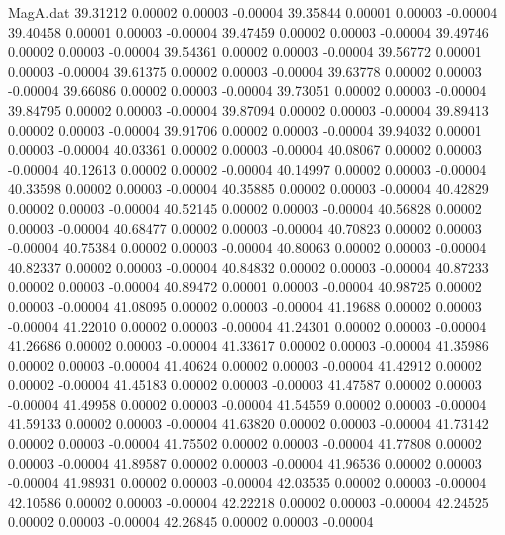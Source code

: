 \begin{filecontents}{MagA.dat}
  39.31212    0.00002    0.00003   -0.00004
  39.35844    0.00001    0.00003   -0.00004
  39.40458    0.00001    0.00003   -0.00004
  39.47459    0.00002    0.00003   -0.00004
  39.49746    0.00002    0.00003   -0.00004
  39.54361    0.00002    0.00003   -0.00004
  39.56772    0.00001    0.00003   -0.00004
  39.61375    0.00002    0.00003   -0.00004
  39.63778    0.00002    0.00003   -0.00004
  39.66086    0.00002    0.00003   -0.00004
  39.73051    0.00002    0.00003   -0.00004
  39.84795    0.00002    0.00003   -0.00004
  39.87094    0.00002    0.00003   -0.00004
  39.89413    0.00002    0.00003   -0.00004
  39.91706    0.00002    0.00003   -0.00004
  39.94032    0.00001    0.00003   -0.00004
  40.03361    0.00002    0.00003   -0.00004
  40.08067    0.00002    0.00003   -0.00004
  40.12613    0.00002    0.00002   -0.00004
  40.14997    0.00002    0.00003   -0.00004
  40.33598    0.00002    0.00003   -0.00004
  40.35885    0.00002    0.00003   -0.00004
  40.42829    0.00002    0.00003   -0.00004
  40.52145    0.00002    0.00003   -0.00004
  40.56828    0.00002    0.00003   -0.00004
  40.68477    0.00002    0.00003   -0.00004
  40.70823    0.00002    0.00003   -0.00004
  40.75384    0.00002    0.00003   -0.00004
  40.80063    0.00002    0.00003   -0.00004
  40.82337    0.00002    0.00003   -0.00004
  40.84832    0.00002    0.00003   -0.00004
  40.87233    0.00002    0.00003   -0.00004
  40.89472    0.00001    0.00003   -0.00004
  40.98725    0.00002    0.00003   -0.00004
  41.08095    0.00002    0.00003   -0.00004
  41.19688    0.00002    0.00003   -0.00004
  41.22010    0.00002    0.00003   -0.00004
  41.24301    0.00002    0.00003   -0.00004
  41.26686    0.00002    0.00003   -0.00004
  41.33617    0.00002    0.00003   -0.00004
  41.35986    0.00002    0.00003   -0.00004
  41.40624    0.00002    0.00003   -0.00004
  41.42912    0.00002    0.00002   -0.00004
  41.45183    0.00002    0.00003   -0.00003
  41.47587    0.00002    0.00003   -0.00004
  41.49958    0.00002    0.00003   -0.00004
  41.54559    0.00002    0.00003   -0.00004
  41.59133    0.00002    0.00003   -0.00004
  41.63820    0.00002    0.00003   -0.00004
  41.73142    0.00002    0.00003   -0.00004
  41.75502    0.00002    0.00003   -0.00004
  41.77808    0.00002    0.00003   -0.00004
  41.89587    0.00002    0.00003   -0.00004
  41.96536    0.00002    0.00003   -0.00004
  41.98931    0.00002    0.00003   -0.00004
  42.03535    0.00002    0.00003   -0.00004
  42.10586    0.00002    0.00003   -0.00004
  42.22218    0.00002    0.00003   -0.00004
  42.24525    0.00002    0.00003   -0.00004
  42.26845    0.00002    0.00003   -0.00004

\end{filecontents}
